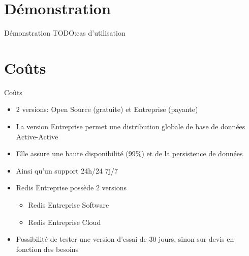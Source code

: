 \documentclass[aspectratio=169]{beamer}
\newcommand{\TODO}{TODO:}
\begin{document}
\section{Démonstration}
\begin{frame}{Démonstration}
\TODO cas d'utilisation
\end{frame}

\section{Coûts}
\begin{frame}{Coûts}
\begin{center}

\begin{itemize}
    \item 2 versions: Open Source (gratuite) et Entreprise (payante)
    \item La version Entreprise permet une distribution globale de base de données Active-Active
    \item Elle assure une haute disponibilité (99\%) et de la persistence de données
    \item Ainsi qu'un support 24h/24 7j/7
    \item Redis Entreprise possède 2 versions
    \begin{itemize}
    \item Redis Entreprise Software
    \item Redis Entreprise Cloud
    \end{itemize}
    \item Possibilité de tester une version d'essai de 30 jours, sinon sur devis en fonction des besoins
\end{itemize}
\end{center}
\end{frame}
\end{document}
